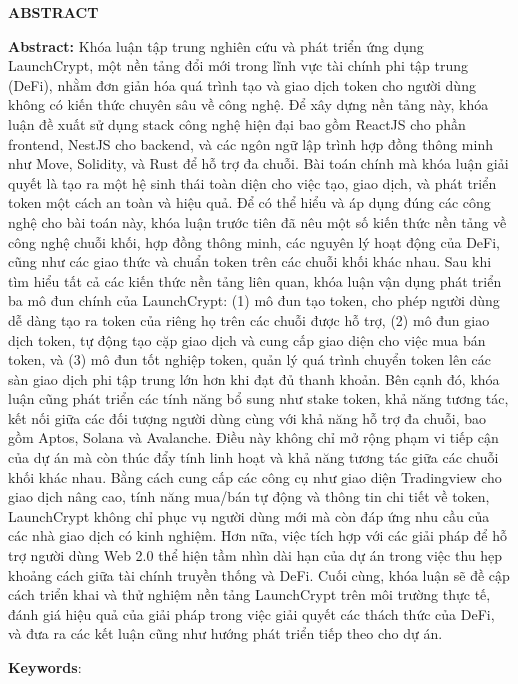 \begin{center}
    \textbf{\large{ABSTRACT}	}
  \end{center}
  
  
  \begin{small}
  
    \textbf{Abstract:} Khóa luận tập trung nghiên cứu và phát triển ứng dụng
    LaunchCrypt,
    một nền tảng đổi mới trong lĩnh vực tài chính phi tập trung (DeFi), nhằm đơn
    giản hóa
    quá trình tạo và giao dịch token cho người dùng không có kiến thức chuyên sâu
    về
    công nghệ. Để xây dựng nền tảng này, khóa luận đề xuất sử dụng stack công
    nghệ hiện
    đại bao gồm ReactJS cho phần frontend, NestJS cho backend, và các ngôn ngữ
    lập
    trình hợp đồng thông minh như Move, Solidity, và Rust để hỗ trợ đa chuỗi. Bài toán
    chính mà
    khóa luận giải quyết là tạo ra một hệ sinh thái toàn diện cho việc tạo, giao
    dịch, và
    phát triển token một cách an toàn và hiệu quả. Để có thể hiểu và áp dụng đúng
    các
    công nghệ cho bài toán này, khóa luận trước tiên đã nêu một số kiến thức nền
    tảng về
    công nghệ chuỗi khối, hợp đồng thông minh, các nguyên lý hoạt động của DeFi, cũng như các
    giao thức
    và chuẩn token trên các chuỗi khối khác nhau. Sau khi tìm hiểu tất cả các
    kiến thức
    nền tảng liên quan, khóa luận vận dụng phát triển ba mô đun chính của
    LaunchCrypt:
    (1) mô đun tạo token, cho phép người dùng dễ dàng tạo ra token của riêng họ
    trên các
    chuỗi được hỗ trợ, (2) mô đun giao dịch token, tự động tạo cặp giao dịch
    và cung
    cấp giao diện cho việc mua bán token, và (3) mô đun tốt nghiệp token, quản lý
    quá
    trình chuyển token lên các sàn giao dịch phi tập trung lớn hơn khi đạt đủ
    thanh khoản.
    Bên cạnh đó, khóa luận cũng phát triển các tính năng bổ sung như stake token,
    khả năng tương tác, kết nối giữa các đối tượng người dùng cùng với khả năng hỗ
    trợ đa chuỗi, bao gồm Aptos, Solana và Avalanche. Điều này không chỉ mở rộng
    phạm vi tiếp cận của dự án mà còn thúc đẩy tính linh hoạt và khả năng tương tác
    giữa các chuỗi khối khác nhau. Bằng
    cách cung cấp các công cụ như giao diện Tradingview cho giao dịch nâng cao,
    tính năng
    mua/bán tự động và thông tin chi tiết về token, LaunchCrypt không chỉ phục vụ
    người
    dùng mới mà còn đáp ứng nhu cầu của các nhà giao dịch có kinh nghiệm. Hơn
    nữa,
    việc tích hợp với các giải pháp để hỗ trợ người dùng Web 2.0 thể hiện tầm
    nhìn dài hạn
    của dự án trong việc thu hẹp khoảng cách giữa tài chính truyền thống và DeFi.
    Cuối
    cùng, khóa luận sẽ đề cập cách triển khai và thử nghiệm nền tảng LaunchCrypt
    trên
    môi trường thực tế, đánh giá hiệu quả của giải pháp trong việc giải quyết các
    thách
    thức của DeFi, và đưa ra các kết luận cũng như hướng phát triển tiếp theo cho
    dự án.
  
    \textbf{Keywords}: \textit{}
  
  
  \end{small}